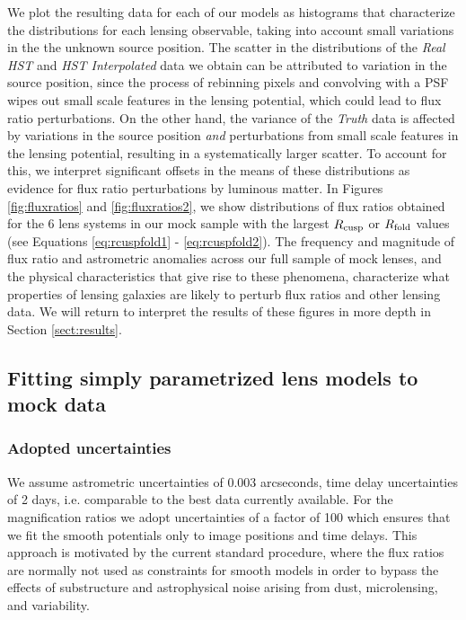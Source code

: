 \newline \indent We plot the resulting data for each of our models as histograms that characterize the distributions for each lensing observable, taking into account small variations in the the unknown source position. The scatter in the distributions of the \textit{Real HST} and \textit{HST Interpolated} data we obtain can be attributed to variation in the source position, since the process of rebinning pixels and convolving with a PSF wipes out small scale features in the lensing potential, which could lead to flux ratio perturbations. On the other hand, the variance of the \textit{Truth} data is affected by variations in the source position \textit{and} perturbations from small scale features in the lensing potential, resulting in a systematically larger scatter. To account for this, we interpret significant offsets in the means of these distributions as evidence for flux ratio perturbations by luminous matter.
\newline \indent In Figures \ref{fig:fluxratios} and \ref{fig:fluxratios2}, we show distributions of flux ratios obtained for the 6 lens systems in our mock sample with the largest $R_{\rm{cusp}}$ or $R_{\rm{fold}}$ values (see Equations \ref{eq:rcuspfold1} - \ref{eq:rcuspfold2}). The frequency and magnitude of flux ratio and astrometric anomalies across our full sample of mock lenses, and the physical characteristics that give rise to these phenomena, characterize what properties of lensing galaxies are likely to perturb flux ratios and other lensing data. We will return to interpret the results of these figures in more depth in Section \ref{sect:results}.
\subsection{Fitting simply parametrized lens models to mock data}
\label{sect:fitting}
\subsubsection{Adopted uncertainties}
We assume astrometric uncertainties of 0.003 arcseconds, time delay uncertainties of 2 days, i.e. comparable to the best data currently available. For the magnification ratios we adopt uncertainties of a factor of 100 which ensures that we fit the smooth potentials only to image positions and time delays. This approach is motivated by the current standard procedure, where the flux ratios are normally not used as constraints for smooth models in order to bypass the effects of substructure and astrophysical noise arising from dust, microlensing, and variability. 

